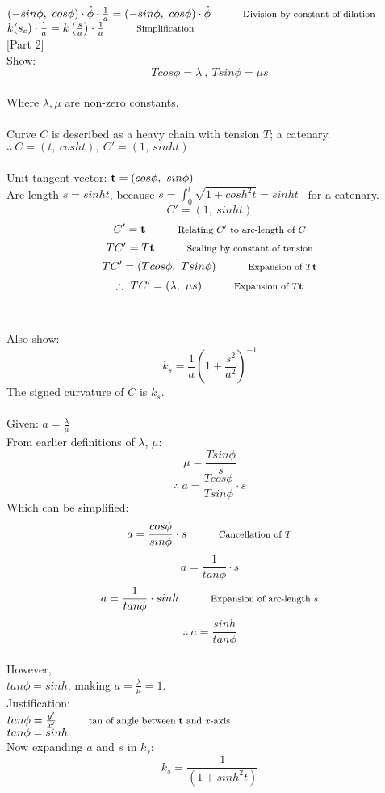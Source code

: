 \documentclass[12pt]{article}
\begin{document}
$ (-sin\phi, \ cos\phi) \cdot \dot\phi \cdot \frac{1}{a} = (-sin\phi,  \ cos\phi) \cdot \dot\phi \hspace{1cm}\textrm{{\footnotesize Division by constant of dilation}}$\\

$ k(s_c)\cdot \frac{1}{a} = k\left( \frac{s}{a} \right) \cdot \frac{1}{a}\hspace{1cm}\textrm{{\footnotesize Simplification}} $\\

\vspace{1cm}
\normalsize
[Part 2]\\

Show:\\
$$ Tcos\phi = \lambda \ , \ Tsin\phi = \mu s $$\\
Where $\lambda, \mu$ are non-zero constants.\\
\\
Curve $C$ is described as a heavy chain with tension $T$; a catenary.\\
$\therefore  \ C = (t, \ cosht), \ C' = (1, \ sinht)$\\
\\
Unit tangent vector: $\bold{t} = (cos\phi, \ sin\phi)$
\\
Arc-length $s = sinht$, because $s = \int_0^t\sqrt{1+cosh^2t} = sinht$  \ for a catenary.\\
$$C' = (1, \ sinht)$$
$$C' = \bold{t} \hspace{1cm}\textrm{{\footnotesize Relating $C'$ to arc-length of $C$}}$$
$$TC' = T\bold{t} \hspace{1cm}\textrm{{\footnotesize Scaling by constant of tension}}$$
$$TC' = (Tcos\phi, \ Tsin\phi) \hspace{1cm}\textrm{{\footnotesize Expansion of $T\bold{t}$}}$$
$$\therefore \ TC' = (\lambda, \ \mu s) \hspace{1cm}\textrm{{\footnotesize Expansion of $T\bold{t}$}}$$
\\
\\
Also show:
$$ k_s = \frac{1}{a}\left(1+\frac{s^2}{a^2}\right)^{-1}$$
The signed curvature of $C$ is $k_s$.
\\
\\
Given: $a = \frac{\lambda}{\mu}$\\
From earlier definitions of $\lambda$, $\mu$:\\
$$\mu = \frac{Tsin\phi}{s}$$
$$ \therefore \ a = \frac{Tcos\phi}{Tsin\phi} \cdot s $$
Which can be simplified:
$$ a = \frac{cos\phi}{sin\phi} \cdot s \hspace{1cm}\textrm{{\footnotesize Cancellation of $T$}}$$
$$ a = \frac{1}{tan\phi} \cdot s $$
$$ a = \frac{1}{tan\phi} \cdot sinh \hspace{1cm}\textrm{{\footnotesize Expansion of arc-length $s$}}$$
$$ \therefore \ a = \frac{sinh}{tan\phi} $$
\\
However,\\
$ tan\phi = sinh $, making $a = \frac{\lambda}{\mu} = 1$.\\

Justification:\\
$tan\phi = \frac{y'}{x'} \hspace{1cm}\textrm{{\footnotesize tan of angle between $\bold{t}$ and $x$-axis }} $\\
$tan\phi = sinh \hspace{1cm}\textrm{{\footnotesize}} $\\

Now expanding $a$ and $s$ in $k_s$:
$$ k_s = \frac{1}{\left(1+sinh^2t\right)}$$
\end{document}
